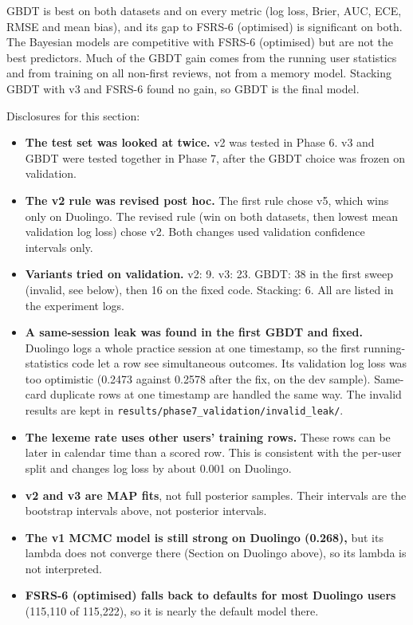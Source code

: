 \documentclass[11pt,a4paper]{article}
\begin{document}
GBDT is best on both datasets and on every metric (log loss, Brier, AUC, ECE, RMSE and mean bias), and its gap to FSRS-6 (optimised) is significant on both. The Bayesian models are competitive with FSRS-6 (optimised) but are not the best predictors. Much of the GBDT gain comes from the running user statistics and from training on all non-first reviews, not from a memory model. Stacking GBDT with v3 and FSRS-6 found no gain, so GBDT is the final model.

Disclosures for this section:
\begin{itemize}
  \item \textbf{The test set was looked at twice.} v2 was tested in Phase 6. v3 and GBDT were tested together in Phase 7, after the GBDT choice was frozen on validation.
  \item \textbf{The v2 rule was revised post hoc.} The first rule chose v5, which wins only on Duolingo. The revised rule (win on both datasets, then lowest mean validation log loss) chose v2. Both changes used validation confidence intervals only.
  \item \textbf{Variants tried on validation.} v2: 9. v3: 23. GBDT: 38 in the first sweep (invalid, see below), then 16 on the fixed code. Stacking: 6. All are listed in the experiment logs.
  \item \textbf{A same-session leak was found in the first GBDT and fixed.} Duolingo logs a whole practice session at one timestamp, so the first running-statistics code let a row see simultaneous outcomes. Its validation log loss was too optimistic (0.2473 against 0.2578 after the fix, on the dev sample). Same-card duplicate rows at one timestamp are handled the same way. The invalid results are kept in \texttt{results/phase7\_validation/\allowbreak invalid\_leak/}.
  \item \textbf{The lexeme rate uses other users' training rows.} These rows can be later in calendar time than a scored row. This is consistent with the per-user split and changes log loss by about 0.001 on Duolingo.
  \item \textbf{v2 and v3 are MAP fits}, not full posterior samples. Their intervals are the bootstrap intervals above, not posterior intervals.
  \item \textbf{The v1 MCMC model is still strong on Duolingo (0.268),} but its lambda does not converge there (Section on Duolingo above), so its lambda is not interpreted.
  \item \textbf{FSRS-6 (optimised) falls back to defaults for most Duolingo users} (115{,}110 of 115{,}222), so it is nearly the default model there.
\end{itemize}
\end{document}
